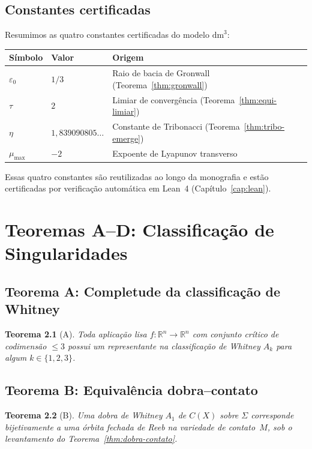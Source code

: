 \documentclass[12pt,a4paper,twoside]{book}
\theoremstyle{plain}
\newtheorem{teorema}{Teorema}[section]
\theoremstyle{definition}
\theoremstyle{definition}
\newcommand{\R}{\mathbb{R}}
\newcommand{\epsz}{\varepsilon_{0}}
\newcommand{\tribo}{\eta}
\newcommand{\dm}{\mathrm{dm}^{3}}
\begin{document}
\section{Constantes certificadas}

Resumimos as quatro constantes certificadas do modelo $\dm$:

\begin{center}
\begin{tabular}{lll}
\toprule
\textbf{Símbolo} & \textbf{Valor} & \textbf{Origem} \\
\midrule
$\epsz$ & $1/3$ & Raio de bacia de Gronwall (Teorema~\ref{thm:gronwall}) \\
$\tau$ & $2$ & Limiar de convergência (Teorema~\ref{thm:equi-limiar}) \\
$\tribo$ & $1{,}839090805\ldots$ & Constante de Tribonacci (Teorema~\ref{thm:tribo-emerge}) \\
$\mu_{\max}$ & $-2$ & Expoente de Lyapunov transverso \\
\bottomrule
\end{tabular}
\end{center}

Essas quatro constantes são reutilizadas ao longo da monografia e estão
certificadas por verificação automática em Lean~4 (Capítulo~\ref{cap:lean}).

\chapter{Teoremas A--D: Classificação de Singularidades}
\label{cap:teoremas-ABCD}

\section{Teorema A: Completude da classificação de Whitney}

\begin{teorema}[A]\label{thm:A}
Toda aplicação lisa $f : \R^{n} \to \R^{n}$ com conjunto crítico de
codimensão $\le 3$ possui um representante na classificação de Whitney
$A_{k}$ para algum $k \in \{1, 2, 3\}$.
\end{teorema}

\section{Teorema B: Equivalência dobra--contato}

\begin{teorema}[B]\label{thm:B}
Uma dobra de Whitney $A_{1}$ de $C(X)$ sobre $\Sigma$ corresponde
bijetivamente a uma órbita fechada de Reeb na variedade de contato~$M$,
sob o levantamento do Teorema~\ref{thm:dobra-contato}.
\end{teorema}
\end{document}
